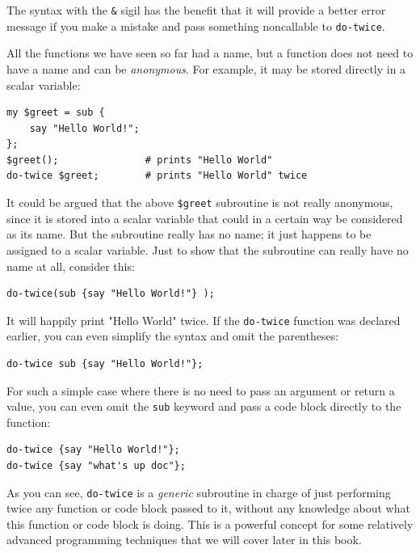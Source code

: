 The syntax with the \verb"&" sigil has the benefit that 
it will provide a better error message if you make a mistake 
and pass something noncallable to \verb"do-twice". 

All the functions we have seen so far had a name, but a 
function does not need to have a name and can be \emph{anonymous}. 
For example, it may be stored directly in a scalar variable:

\begin{verbatim}
my $greet = sub {
    say "Hello World!";
};
$greet();               # prints "Hello World"
do-twice $greet;        # prints "Hello World" twice
\end{verbatim}

It could be argued that the above \verb"$greet" subroutine  
is not really anonymous, since it is stored into a scalar 
variable that could in a certain way be considered as its name. 
But the subroutine really has no name; it just happens to be 
assigned to a scalar variable. Just to show that the subroutine 
can really have no name at all, consider this:

\begin{verbatim}
do-twice(sub {say "Hello World!"} );
\end{verbatim}

It will happily print "Hello World" twice. If the \verb"do-twice"
function was declared earlier, you can even simplify the syntax 
and omit the parentheses:

\begin{verbatim}
do-twice sub {say "Hello World!"};
\end{verbatim}

For such a simple case where there is no need to pass an 
argument or return a value, you can even omit the 
\verb"sub" keyword and pass a code block directly to the function:

\begin{verbatim}
do-twice {say "Hello World!"};
do-twice {say "what's up doc"};
\end{verbatim}

As you can see, \verb"do-twice" is a \emph{generic} subroutine in 
charge of just performing twice any function or code 
block passed to it, without any knowledge about what 
this function or code block is doing. This is a powerful 
concept for some relatively advanced programming techniques 
that we will cover later in this book.

